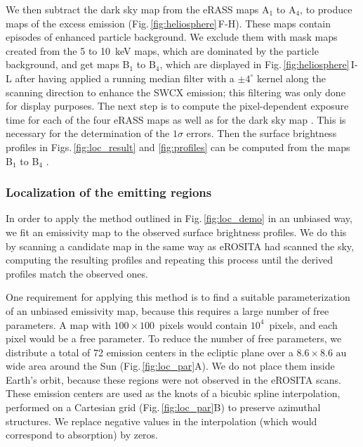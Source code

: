 \documentclass[12pt]{article}
\renewcommand{\deg}{^{\circ}}
\begin{document}
We then subtract the dark sky map from the eRASS maps A$_1$ to A$_4$, to produce maps of the excess emission (Fig.\,\ref{fig:heliosphere}\,F-H). These maps contain episodes of enhanced particle background. We exclude them with mask maps created from the 5 to 10~keV maps, which are dominated by the particle background, and get maps B$_1$ to B$_4$, which are displayed in Fig.\,\ref{fig:heliosphere}\,I-L after having applied a running median filter with a $\pm4\deg$ kernel along the scanning direction to enhance the SWCX emission; this filtering was only done for display purposes. The next step is to compute the pixel-dependent exposure time for each of the four eRASS maps as well as for the dark sky map \cite{code:prep6}. This is necessary for the determination of the $1\sigma$ errors. Then the surface brightness profiles in Figs.\,\ref{fig:loc_result} and {\ref{fig:profiles}} can be computed from the maps B$_1$ to B$_4$ \cite{code:flxobs}.

\subsubsection*{Localization of the emitting regions}

In order to apply the method outlined in Fig.\,\ref{fig:loc_demo} in an unbiased way, we fit an emissivity map to the observed surface brightness profiles. We do this by scanning a candidate map in the same way as eROSITA had scanned the sky, computing the resulting profiles and repeating this process until the derived profiles match the observed ones.

One requirement for applying this method is to find a suitable parameterization of an unbiased emissivity map, because this requires a large number of free parameters. A map with $100\times100$~pixels would contain $10^4$~pixels, and each pixel would be a free parameter. To reduce the number of free parameters, we distribute a total of 72 emission centers in the ecliptic plane over a $8.6\times8.6\mbox{ au}$ wide area around the Sun  (Fig.\,\ref{fig:loc_par}A). We do not place them inside Earth's orbit, because these regions were not observed in the eROSITA scans. These emission centers are used as the knots of a bicubic spline interpolation, performed on a Cartesian grid (Fig.\,\ref{fig:loc_par}B) to preserve azimuthal structures. We replace negative values in the interpolation (which would correspond to absorption) by zeros.
\end{document}
